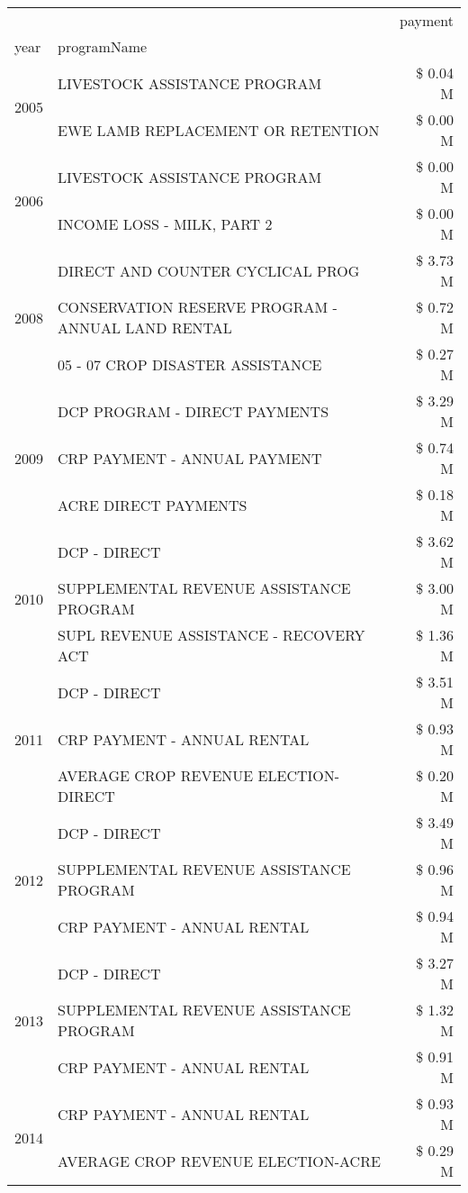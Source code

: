 \begin{tabular}{llr}
\toprule
 &  & payment \\
year & programName &  \\
\midrule
\multirow[t]{2}{*}{2005} & LIVESTOCK ASSISTANCE PROGRAM & \$ 0.04 M \\
 & EWE LAMB REPLACEMENT OR RETENTION & \$ 0.00 M \\
\cline{1-3}
\multirow[t]{2}{*}{2006} & LIVESTOCK ASSISTANCE PROGRAM & \$ 0.00 M \\
 & INCOME LOSS - MILK, PART 2 & \$ 0.00 M \\
\cline{1-3}
\multirow[t]{3}{*}{2008} & DIRECT AND COUNTER CYCLICAL PROG & \$ 3.73 M \\
 & CONSERVATION RESERVE PROGRAM - ANNUAL LAND RENTAL & \$ 0.72 M \\
 & 05 - 07 CROP DISASTER ASSISTANCE & \$ 0.27 M \\
\cline{1-3}
\multirow[t]{3}{*}{2009} & DCP PROGRAM - DIRECT PAYMENTS & \$ 3.29 M \\
 & CRP PAYMENT - ANNUAL PAYMENT & \$ 0.74 M \\
 & ACRE DIRECT PAYMENTS & \$ 0.18 M \\
\cline{1-3}
\multirow[t]{3}{*}{2010} & DCP - DIRECT & \$ 3.62 M \\
 & SUPPLEMENTAL REVENUE ASSISTANCE PROGRAM & \$ 3.00 M \\
 & SUPL REVENUE ASSISTANCE - RECOVERY ACT & \$ 1.36 M \\
\cline{1-3}
\multirow[t]{3}{*}{2011} & DCP - DIRECT & \$ 3.51 M \\
 & CRP PAYMENT - ANNUAL RENTAL & \$ 0.93 M \\
 & AVERAGE CROP REVENUE ELECTION-DIRECT & \$ 0.20 M \\
\cline{1-3}
\multirow[t]{3}{*}{2012} & DCP - DIRECT & \$ 3.49 M \\
 & SUPPLEMENTAL REVENUE ASSISTANCE PROGRAM & \$ 0.96 M \\
 & CRP PAYMENT - ANNUAL RENTAL & \$ 0.94 M \\
\cline{1-3}
\multirow[t]{3}{*}{2013} & DCP - DIRECT & \$ 3.27 M \\
 & SUPPLEMENTAL REVENUE ASSISTANCE PROGRAM & \$ 1.32 M \\
 & CRP PAYMENT - ANNUAL RENTAL & \$ 0.91 M \\
\cline{1-3}
\multirow[t]{3}{*}{2014} & CRP PAYMENT - ANNUAL RENTAL & \$ 0.93 M \\
 & AVERAGE CROP REVENUE ELECTION-ACRE & \$ 0.29 M \\

\end{tabular}
